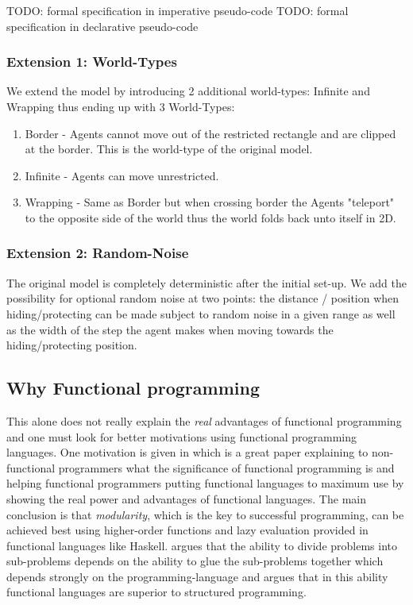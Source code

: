 TODO: formal specification in imperative pseudo-code
TODO: formal specification in declarative pseudo-code 

\subsubsection{Extension 1: World-Types}
We extend the model by introducing 2 additional world-types: Infinite and Wrapping thus ending up with 3 World-Types:

\begin{enumerate}
\item Border - Agents cannot move out of the restricted rectangle and are clipped at the border. This is the world-type of the original model.
\item Infinite - Agents can move unrestricted.
\item Wrapping - Same as Border but when crossing border the Agents "teleport" to the opposite side of the world thus the world folds back unto itself in 2D.
\end{enumerate}

\subsubsection{Extension 2: Random-Noise}
The original model is completely deterministic after the initial set-up. We add the possibility for optional random noise at two points: the distance / position when hiding/protecting can be made subject to random noise in a given range as well as the width of the step the agent makes when moving towards the hiding/protecting position.

\subsection{Why Functional programming}
This alone does not really explain the \textit{real} advantages of functional programming and one must look for better motivations using functional programming languages. One motivation is given in \cite{hughes_why_1989} which is a great paper explaining to non-functional programmers what the significance of functional programming is and helping functional programmers putting functional languages to maximum use by showing the real power and advantages of functional languages. The main conclusion is that \textit{modularity}, which is the key to successful programming, can be achieved best using higher-order functions and lazy evaluation provided in functional languages like Haskell. \cite{hughes_why_1989} argues that the ability to divide problems into sub-problems depends on the ability to glue the sub-problems together which depends strongly on the programming-language and \cite{hughes_why_1989} argues that in this ability functional languages are superior to structured programming.

